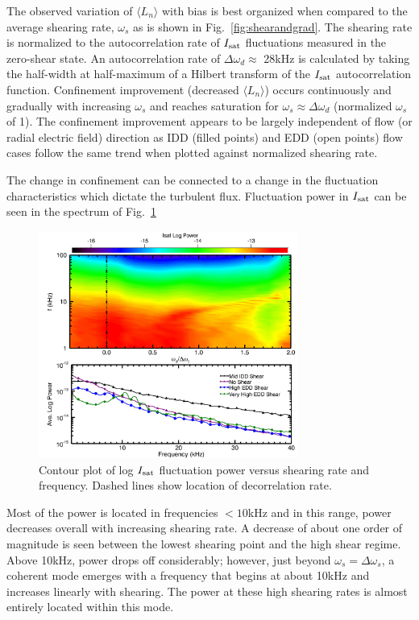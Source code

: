 \documentclass[aps,prl,amsmath,amssymb,preprint,superscriptaddress]{revtex4}
\begin{document}
The observed variation of $\langle L_{n} \rangle$ with bias is best organized when compared to the average shearing rate, $\omega_s$ as is shown in Fig.~\ref{fig:shearandgrad}.   The shearing rate is normalized to the autocorrelation rate of $I_{\rm sat}$ fluctuations measured in the zero-shear state.  An autocorrelation rate of $\Delta \omega_{d} \approx $ 28kHz is calculated by taking the half-width at half-maximum of a Hilbert transform of the $I_{\rm sat}$ autocorrelation function.  Confinement improvement (decreased $\langle L_n \rangle$) occurs continuously and gradually with increasing $\omega_{s}$ and reaches saturation for $\omega_{s} \approx \Delta \omega_{d}$ (normalized $\omega_s$ of 1).  The confinement improvement appears to be largely independent of flow (or radial electric field) direction as IDD (filled points) and EDD (open points) flow cases follow the same trend when plotted against normalized shearing rate.




The change in confinement can be connected to a change in the fluctuation characteristics which dictate the turbulent flux. Fluctuation power in $I_{\rm sat}$ can be seen in the spectrum of Fig.~\ref{fig:powercontour}
\begin{figure}
\begin{center}
\includegraphics[width=8.5cm]{powercontour.pdf}%
\caption{\label{fig:powercontour} Contour plot of log $I_{\rm sat}$ fluctuation power versus shearing rate and frequency. Dashed lines show location of decorrelation rate.}
\end{center}
\end{figure}
Most of the power is located in frequencies $<10$kHz and in this range, power decreases overall with increasing shearing rate. A decrease of about one order of magnitude is seen between the lowest shearing point and the high shear regime. Above 10kHz, power drops off considerably; however, just beyond $\omega_{s} = \Delta \omega_{s}$, a coherent mode emerges with a frequency that begins at about 10kHz and increases linearly with shearing. The power at these high shearing rates is almost entirely located within this mode.
\end{document}
